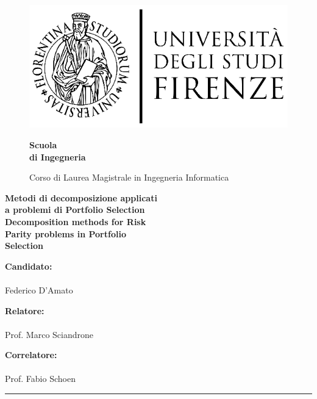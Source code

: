 \begin{figure}[htbp]
\begin{minipage}{0.3\textwidth}
\centering
\includegraphics[scale=0.8]{logo_universita.eps}
\end{minipage}
\hspace{0.3\textwidth}
\begin{minipage}{0.4\textwidth}
\centering
\begin{flushright}
{\Large \textbf{Scuola\\
 di Ingegneria \\}
}
\end{flushright}
\begin{flushright}
Corso di Laurea Magistrale in Ingegneria Informatica
\end{flushright}
\end{minipage}

\end{figure}


\vspace{10mm}
\begin{center}

{\huge {\bf Metodi di decomposizione applicati\\}}
\vspace{2mm}
{\huge{\bf a problemi di Portfolio Selection}}\\
\vspace{15mm}
 {\huge {\bf Decomposition methods for Risk}}\\
 \vspace{2mm}
 {\huge{\bf Parity problems in Portfolio}}\\
 \vspace{2mm}
 {\huge{\bf Selection}}\\

\end{center}
\vspace{15mm}

{\Large \textbf{Candidato:}}\\
\vspace{-3.5mm}\\
{\LARGE Federico D'Amato\\}

{\Large \textbf{Relatore:}}\\
\vspace{-3.5mm}\\
{\LARGE Prof. Marco Sciandrone\\}

{\Large \textbf{Correlatore:}}\\
\vspace{-3.5mm}\\
{\LARGE Prof. Fabio Schoen}


\vfill
\begin{center}
\rule{0.7\textwidth}{.4pt}
\end{center}
\vspace{-4mm}
